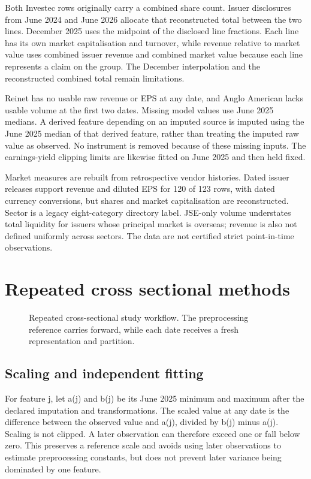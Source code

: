 Both Investec rows originally carry a combined share count. Issuer disclosures from June 2024 and June 2026 allocate that reconstructed total between the two lines. December 2025 uses the midpoint of the disclosed line fractions. Each line has its own market capitalisation and turnover, while revenue relative to market value uses combined issuer revenue and combined market value because each line represents a claim on the group. The December interpolation and the reconstructed combined total remain limitations.


Reinet has no usable raw revenue or EPS at any date, and Anglo American lacks usable volume at the first two dates. Missing model values use June 2025 medians. A derived feature depending on an imputed source is imputed using the June 2025 median of that derived feature, rather than treating the imputed raw value as observed. No instrument is removed because of these missing inputs. The earnings-yield clipping limits are likewise fitted on June 2025 and then held fixed.


Market measures are rebuilt from retrospective vendor histories. Dated issuer releases support revenue and diluted EPS for 120 of 123 rows, with dated currency conversions, but shares and market capitalisation are reconstructed. Sector is a legacy eight-category directory label. JSE-only volume understates total liquidity for issuers whose principal market is overseas; revenue is also not defined uniformly across sectors. The data are not certified strict point-in-time observations.


\FloatBarrier
\section{Repeated cross sectional methods}


\begin{figure}[htbp]
\centering
{}
\caption{Repeated cross-sectional study workflow. The preprocessing reference carries forward, while each date receives a fresh representation and partition.}\label{fig:pipeline}
\end{figure}


\subsection{Scaling and independent fitting}

For feature j, let a(j) and b(j) be its June 2025 minimum and maximum after the declared imputation and transformations. The scaled value at any date is the difference between the observed value and a(j), divided by b(j) minus a(j). Scaling is not clipped. A later observation can therefore exceed one or fall below zero. This preserves a reference scale and avoids using later observations to estimate preprocessing constants, but does not prevent later variance being dominated by one feature.


